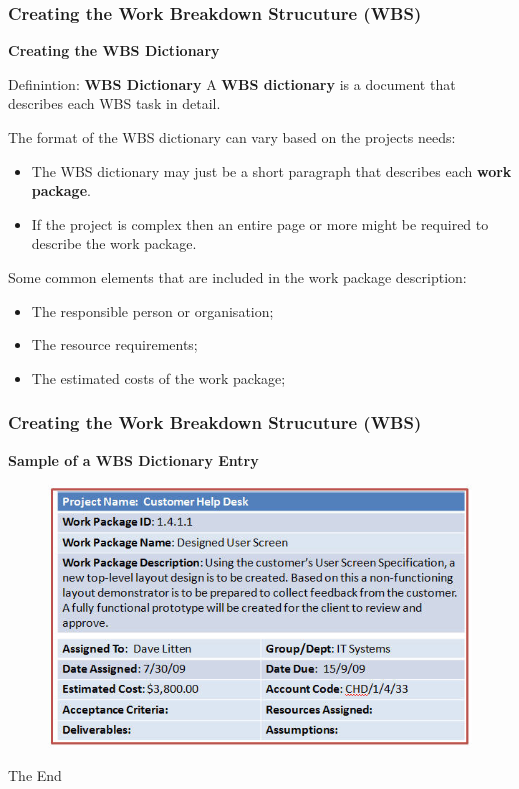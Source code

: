 \documentclass{beamer}
\begin{document}
\begin{frame}
\frametitle{Creating the Work Breakdown Strucuture (WBS)}
\textbf{Creating the WBS Dictionary}
\vspace{0.25cm}
\begin{block}{Definintion: \textbf{WBS Dictionary}}
A \textbf{WBS dictionary} is a document that describes each WBS task in detail.
\end{block}
\vspace{0.25cm}
The format of the WBS dictionary can vary based on the projects needs:
\begin{itemize}
\item The WBS dictionary may just be a short paragraph that describes each \textbf{work package}.
\item If the project is complex then an entire page or more might be required to describe the work package.
\end{itemize}
\vspace{0.2cm}
Some common elements that are included in the work package description:
\vspace{-0.5cm}
\begin{itemize}
\item The responsible person or organisation;
\item The resource requirements;
\item The estimated costs of the work package;
\end{itemize}
\end{frame}


\begin{frame}
\frametitle{Creating the Work Breakdown Strucuture (WBS)}
\textbf{Sample of a WBS Dictionary Entry}
\vspace{0.5cm}
\begin{figure}
\includegraphics[scale=0.5]{wbsdictionary}
\end{figure}
\end{frame}


\begin{frame}
\begin{center}
\huge The End
\end{center}
\end{frame}
\end{document}
